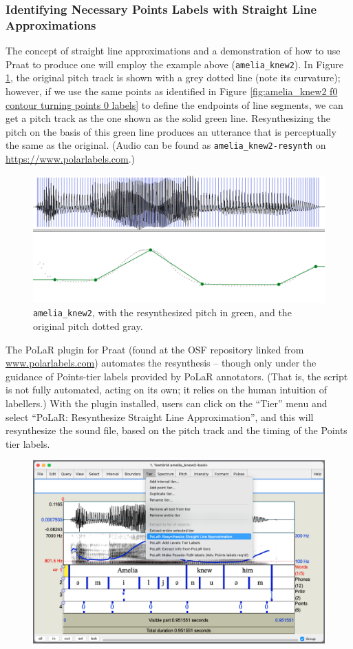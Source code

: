 \documentclass[11pt, twoside]{memoir}
\begin{document}
{{\subsubsection{Identifying Necessary Points Labels with Straight Line Approximations}\label{sec:identifying-necessary-points-labels-with-straight-line-approximations}
The concept of straight line approximations and a demonstration of how to use Praat to produce one will employ the example above (\texttt{amelia\_knew2}). In Figure \ref{fig:amelia_knew2 resynth}, the original pitch track is shown with a grey dotted line (note its curvature); however, if we use the same points as identified in Figure \ref{fig:amelia_knew2 f0 contour turning points 0 labels} to define the endpoints of line segments, we can get a pitch track as the one shown as the solid green line. Resynthesizing the pitch on the basis of this green line produces an utterance that is perceptually the same as the original. (Audio can be found as \texttt{amelia\_knew2-resynth} on \url{https://www.polarlabels.com}.)
\begin{figure}[H]
\centering
\includegraphics[width=.875\linewidth]{Points-amelia_knew2-resynth.png}
\caption{\texttt{amelia\_knew2}, with the resynthesized pitch in green, and the original pitch dotted gray.
\label{fig:amelia_knew2 resynth}
}
\end{figure}
The PoLaR plugin for Praat (found at the OSF repository linked from \href{https://www.polarlabels.com}{www.polarlabels.com}) automates the resynthesis – though only under the guidance of Points-tier labels provided by PoLaR annotators. (That is, the script is not fully automated, acting on its own; it relies on the human intuition of labellers.) With the plugin installed, users can click on the “Tier” menu and select “PoLaR: Resynthesize Straight Line Approximation”, and this will resynthesize the sound file, based on the pitch track and the timing of the Points tier labels.
\begin{figure}[H]
\centering
\includegraphics[width=.875\linewidth]{Points-amelia_knew2-before-SLA.png}

\end{figure}}}
\end{document}
